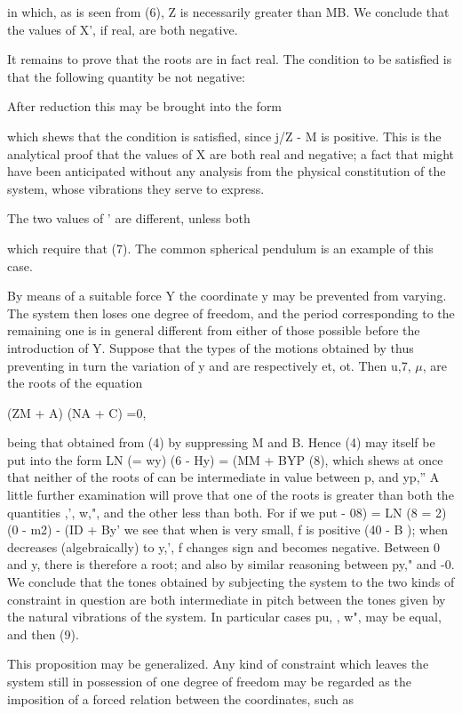 in which, as is seen from (6), Z is necessarily greater than MB. We conclude
that the values of X', if real, are both negative.

It remains to prove that the roots are in fact real. The condition to be
satisfied is that the following quantity be not negative:

After reduction this may be brought into the form

which shews that the condition is satisfied, since j/Z - M is positive.  This
is the analytical proof that the values of X are both real and negative; a fact
that might have been anticipated without any analysis from the physical
constitution of the system, whose vibrations they serve to express.


The two values of ' are different, unless both

which require that (7). The common spherical pendulum is an example of this
case.

By means of a suitable force Y the coordinate y may be prevented from varying.
The system then loses one degree of freedom, and the period corresponding to
the remaining one is in general different from either of those possible before
the introduction of Y. Suppose that the types of the motions obtained by thus
preventing in turn the variation of y and are respectively et, ot. Then u,7,
\(\mu\), are the roots of the equation

(ZM + A) (NA + C) =0,

being that obtained from (4) by suppressing M and B. Hence (4) may itself be
put into the form LN (= wy) (6 - Hy) = (MM + BYP (8), which shews at once that
neither of the roots of can be intermediate in value between p, and yp,'' A
little further examination will prove that one of the roots is greater than
both the quantities ,', w,", and the other less than both. For if we put - 08)
= LN (8 = 2) (0 - m2) - (ID + By' we see that when is very small, f is positive
(40 - B ); when decreases (algebraically) to y,', f changes sign and becomes
negative. Between 0 and y, there is therefore a root; and also by similar
reasoning between py," and -0. We conclude that the tones obtained by
subjecting the system to the two kinds of constraint in question are both
intermediate in pitch between the tones given by the natural vibrations of the
system. In particular cases pu, , w", may be equal, and then (9).

This proposition may be generalized. Any kind of constraint which leaves the
system still in possession of one degree of freedom may be regarded as the
imposition of a forced relation between the coordinates, such as

